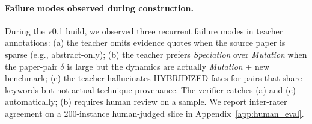 \paragraph{Failure modes observed during construction.}
During the \genetrace{} v0.1 build, we observed three recurrent failure
modes in teacher annotations: (a) the teacher omits evidence quotes
when the source paper is sparse (e.g., abstract-only); (b) the teacher
prefers \textit{Speciation} over \textit{Mutation} when the paper-pair
$\delta$ is large but the dynamics are actually \textit{Mutation} + new
benchmark; (c) the teacher hallucinates HYBRIDIZED fates for pairs that
share keywords but not actual technique provenance. The verifier
catches (a) and (c) automatically; (b) requires human review on a
sample. We report inter-rater agreement on a 200-instance human-judged
slice in Appendix~\ref{app:human_eval}.
